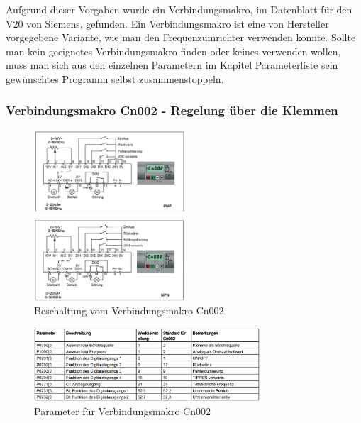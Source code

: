 Aufgrund dieser Vorgaben wurde ein Verbindungsmakro, im Datenblatt für den V20 von Siemens, gefunden. 
Ein Verbindungsmakro ist eine von Hersteller vorgegebene Variante, wie man den Frequenzumrichter verwenden könnte. Sollte man kein geeignetes Verbindungsmakro finden oder keines verwenden wollen, muss man sich aus den einzelnen Parametern im Kapitel Parameterliste sein gewünschtes Programm selbst zusammenstoppeln. 

\subsubsection{Verbindungsmakro Cn002 - Regelung über die Klemmen}

\begin{figure}[!ht]
\begin{center}
	\caption{Beschaltung vom Verbindungsmakro Cn002 \label{fig:verbindungsmakro}}
	\includegraphics[width=0.5\textwidth]{VerbindungsmakroAufbau}
\end{center}
\end{figure}

\begin{figure}[!ht]
\begin{center}
	\caption{Parameter für Verbindungsmakro Cn002 \label{fig:parameterVerbindungsmakro}}
	\includegraphics[width=0.75\textwidth]{VerbindungsmakroParameter}
\end{center}
\end{figure}

